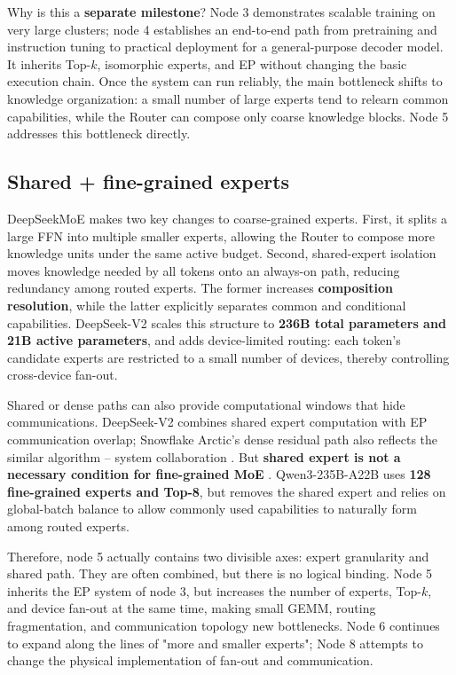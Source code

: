 \documentclass[10pt,a4paper,fontset=none]{ctexart}
\newcommand{\term}[1]{\textbf{#1}}
\begin{document}
Why is this a \textbf{separate milestone}? Node 3 demonstrates scalable training on very large clusters; node 4 establishes an end-to-end path from pretraining and instruction tuning to practical deployment for a general-purpose decoder model. It inherits Top-$k$, isomorphic experts, and EP without changing the basic execution chain. Once the system can run reliably, the main bottleneck shifts to knowledge organization: a small number of large experts tend to relearn common capabilities, while the Router can compose only coarse knowledge blocks. Node 5 addresses this bottleneck directly.

\subsection{Shared + fine-grained experts}

DeepSeekMoE makes two key changes to coarse-grained experts\cite{dai2024deepseekmoe}. First, it splits a large FFN into multiple smaller experts, allowing the Router to compose more knowledge units under the same active budget. Second, shared-expert isolation moves knowledge needed by all tokens onto an always-on path, reducing redundancy among routed experts. The former increases \term{composition resolution}, while the latter explicitly separates common and conditional capabilities. DeepSeek-V2 scales this structure to \textbf{236B total parameters and 21B active parameters}, and adds device-limited routing: each token's candidate experts are restricted to a small number of devices, thereby controlling cross-device fan-out\cite{deepseekv2}.

Shared or dense paths can also provide computational windows that hide communications. DeepSeek-V2 combines shared expert computation with EP communication overlap; Snowflake Arctic's dense residual path also reflects the similar algorithm -- system collaboration \cite{snowflakearctic}. But \term{shared expert is not a necessary condition for fine-grained MoE }. Qwen3-235B-A22B uses \textbf{128 fine-grained experts and Top-8}, but removes the shared expert and relies on global-batch balance to allow commonly used capabilities to naturally form \cite{qwen3} among routed experts.

Therefore, node 5 actually contains two divisible axes: expert granularity and shared path. They are often combined, but there is no logical binding. Node 5 inherits the EP system of node 3, but increases the number of experts, Top-$k$, and device fan-out at the same time, making small GEMM, routing fragmentation, and communication topology new bottlenecks. Node 6 continues to expand along the lines of "more and smaller experts"; Node 8 attempts to change the physical implementation of fan-out and communication.
\end{document}
